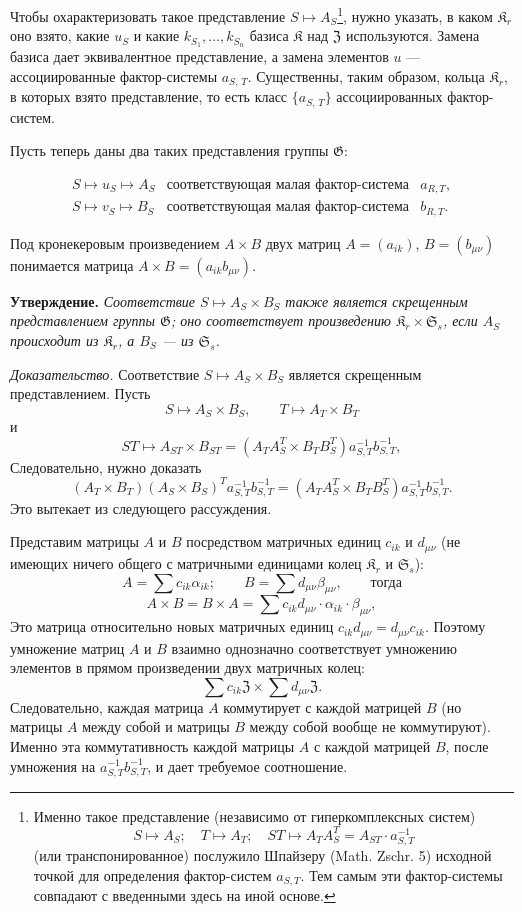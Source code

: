 \documentclass[11pt]{article}
\newcommand{\srcfn}[2]{\footnote{#2}}
\begin{document}
Чтобы охарактеризовать такое представление \(S\mapsto A_S\)\srcfn{1}{Именно такое представление (независимо от гиперкомплексных систем)
\[
S\mapsto A_S;\quad T\mapsto A_T;\quad ST\mapsto A_TA_S^T=A_{ST}\cdot a_{S,T}^{-1}
\]
(или транспонированное) послужило Шпайзеру (Math. Zschr. 5) исходной точкой для определения фактор-систем \(a_{S,T}\). Тем самым эти фактор-системы совпадают с введенными здесь на иной основе.}, нужно указать, в каком \(\mathfrak K_r\) оно взято, какие \(u_S\) и какие \(k_{S_1},\ldots,k_{S_n}\) базиса \(\mathfrak K\) над \(\mathfrak Z\) используются. Замена базиса дает эквивалентное представление, а замена элементов \(u\) --- ассоциированные фактор-системы \(a_{S,\,T}\). Существенны, таким образом, кольца \(\mathfrak K_r\), в которых взято представление, то есть класс \(\{a_{S,\,T}\}\) ассоциированных фактор-систем.

Пусть теперь даны два таких представления группы \(\mathfrak G\):

\[
\begin{array}{lll}
S\mapsto u_S\mapsto A_S & \text{соответствующая малая фактор-система} & a_{R,T},\\
S\mapsto v_S\mapsto B_S & \text{соответствующая малая фактор-система} & b_{R,T}.
\end{array}
\]

Под кронекеровым произведением \(A\times B\) двух матриц \(A=(a_{ik})\), \(B=(b_{\mu\nu})\) понимается матрица \(A\times B=(a_{ik}b_{\mu\nu})\).

\noindent\textbf{Утверждение.} \emph{Соответствие \(S\mapsto A_S\times B_S\) также является скрещенным представлением группы \(\mathfrak G\); оно соответствует произведению \(\mathfrak K_r\times\mathfrak S_s\), если \(A_S\) происходит из \(\mathfrak K_r\), а \(B_S\) --- из \(\mathfrak S_s\).}

\noindent\emph{Доказательство.} Соответствие \(S\mapsto A_S\times B_S\) является скрещенным представлением. Пусть
\[
S\mapsto A_S\times B_S,\qquad T\mapsto A_T\times B_T
\]
и
\[
ST\mapsto A_{ST}\times B_{ST}
=(A_TA_S^T\times B_TB_S^T)a_{S,T}^{-1}b_{S,T}^{-1},
\]
Следовательно, нужно доказать
\[
(A_T\times B_T)(A_S\times B_S)^T a_{S,T}^{-1}b_{S,T}^{-1}
=(A_TA_S^T\times B_TB_S^T)a_{S,T}^{-1}b_{S,T}^{-1}.
\]
Это вытекает из следующего рассуждения.

Представим матрицы \(A\) и \(B\) посредством матричных единиц \(c_{ik}\) и \(d_{\mu\nu}\) (не имеющих ничего общего с матричными единицами колец \(\mathfrak K_r\) и \(\mathfrak S_s\)):
\[
A=\sum c_{ik}\alpha_{ik};\qquad
B=\sum d_{\mu\nu}\beta_{\mu\nu},\qquad\text{тогда}
\]
\[
A\times B=B\times A
=\sum c_{ik}d_{\mu\nu}\cdot\alpha_{ik}\cdot\beta_{\mu\nu},
\]
Это матрица относительно новых матричных единиц \(c_{ik}d_{\mu\nu}=d_{\mu\nu}c_{ik}\). Поэтому умножение матриц \(A\) и \(B\) взаимно однозначно соответствует умножению элементов в прямом произведении двух матричных колец:
\[
\sum c_{ik}\mathfrak Z\times\sum d_{\mu\nu}\mathfrak Z.
\]
Следовательно, каждая матрица \(A\) коммутирует с каждой матрицей \(B\) (но матрицы \(A\) между собой и матрицы \(B\) между собой вообще не коммутируют). Именно эта коммутативность каждой матрицы \(A\) с каждой матрицей \(B\), после умножения на \(a_{S,T}^{-1}b_{S,T}^{-1}\), и дает требуемое соотношение.
\end{document}

